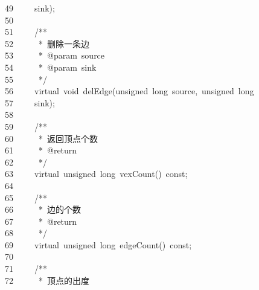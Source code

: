 \documentclass{ctexart}
\newcommand{\hlstd}[1]{\textcolor[rgb]{0.2,0.2,0.2}{#1}}
\newcommand{\hlcom}[1]{\textcolor[rgb]{0.59,0.59,0.59}{#1}}
\newcommand{\hlopt}[1]{\textcolor[rgb]{0.2,0.2,0.2}{#1}}
\newcommand{\hllin}[1]{\textcolor[rgb]{0.59,0.59,0.59}{#1}}
\newcommand{\hlkwb}[1]{\textcolor[rgb]{0.63,0,0.31}{#1}}
\newcommand{\hlkwc}[1]{\textcolor[rgb]{0,0.63,0.31}{#1}}
\newcommand{\hlkwd}[1]{\textcolor[rgb]{0.78,0.23,0.41}{#1}}
\begin{document}
\hllin{49\ }\hlstd{}\hlstd{\ \ \ \ }\hlstd{sink}\hlopt{);}\\
\hllin{50\ }\hlstd{}\\
\hllin{51\ }\hlstd{}\hlstd{\ \ \ \ }\hlstd{}\hlcom{/{*}{*}}\\
\hllin{52\ }\hlcom{}\hlstd{\ \ \ \ \ }\hlcom{{*}\ 删除一条边}\\
\hllin{53\ }\hlcom{}\hlstd{\ \ \ \ \ }\hlcom{{*}\ @param\ source}\\
\hllin{54\ }\hlcom{}\hlstd{\ \ \ \ \ }\hlcom{{*}\ @param\ sink}\\
\hllin{55\ }\hlcom{}\hlstd{\ \ \ \ \ }\hlcom{{*}/}\hlstd{}\\
\hllin{56\ }\hlstd{}\hlstd{\ \ \ \ }\hlstd{}\hlkwc{virtual\ }\hlstd{}\hlkwb{void\ }\hlstd{}\hlkwd{delEdge}\hlstd{}\hlopt{(}\hlstd{}\hlkwb{unsigned\ long\ }\hlstd{source}\hlopt{,\ }\hlstd{}\hlkwb{unsigned\ long\ }\Righttorque\\
\hllin{57\ }\hlstd{}\hlstd{\ \ \ \ }\hlstd{sink}\hlopt{);}\\
\hllin{58\ }\hlstd{}\\
\hllin{59\ }\hlstd{}\hlstd{\ \ \ \ }\hlstd{}\hlcom{/{*}{*}}\\
\hllin{60\ }\hlcom{}\hlstd{\ \ \ \ \ }\hlcom{{*}\ 返回顶点个数}\\
\hllin{61\ }\hlcom{}\hlstd{\ \ \ \ \ }\hlcom{{*}\ @return}\\
\hllin{62\ }\hlcom{}\hlstd{\ \ \ \ \ }\hlcom{{*}/}\hlstd{}\\
\hllin{63\ }\hlstd{}\hlstd{\ \ \ \ }\hlstd{}\hlkwc{virtual\ }\hlstd{}\hlkwb{unsigned\ long\ }\hlstd{}\hlkwd{vexCount}\hlstd{}\hlopt{()\ }\hlstd{}\hlkwb{const}\hlstd{}\hlopt{;}\\
\hllin{64\ }\hlstd{}\\
\hllin{65\ }\hlstd{}\hlstd{\ \ \ \ }\hlstd{}\hlcom{/{*}{*}}\\
\hllin{66\ }\hlcom{}\hlstd{\ \ \ \ \ }\hlcom{{*}\ 边的个数}\\
\hllin{67\ }\hlcom{}\hlstd{\ \ \ \ \ }\hlcom{{*}\ @return}\\
\hllin{68\ }\hlcom{}\hlstd{\ \ \ \ \ }\hlcom{{*}/}\hlstd{}\\
\hllin{69\ }\hlstd{}\hlstd{\ \ \ \ }\hlstd{}\hlkwc{virtual\ }\hlstd{}\hlkwb{unsigned\ long\ }\hlstd{}\hlkwd{edgeCount}\hlstd{}\hlopt{()\ }\hlstd{}\hlkwb{const}\hlstd{}\hlopt{;}\\
\hllin{70\ }\hlstd{}\\
\hllin{71\ }\hlstd{}\hlstd{\ \ \ \ }\hlstd{}\hlcom{/{*}{*}}\\
\hllin{72\ }\hlcom{}\hlstd{\ \ \ \ \ }\hlcom{{*}\ 顶点的出度}\\
\end{document}
